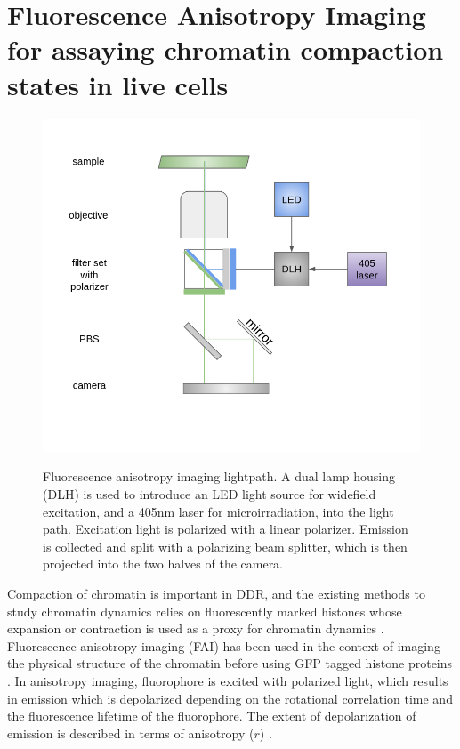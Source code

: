 \chapter{Fluorescence Anisotropy Imaging for assaying chromatin compaction states in live cells}
\begin{figure}[!htp]
    {\hfill\includegraphics[trim=0 50 0 60,clip,width=0.8\linewidth]{figures/setup.png}\hspace*{\fill}}
    \caption{Fluorescence anisotropy imaging lightpath. A dual lamp housing (DLH) is used to introduce an LED light source for widefield excitation, and a 405nm laser for microirradiation, into the light path. Excitation light is polarized with a linear polarizer. Emission is collected and split with a polarizing beam splitter, which is then projected into the two halves of the camera.}
    {\label{fig:setup}}
\end{figure}
Compaction of chromatin is important in DDR, and the existing methods to study chromatin dynamics relies on fluorescently marked histones whose expansion or contraction is used as a proxy for chromatin dynamics \cite{BURGESS20141703}. Fluorescence anisotropy imaging (FAI) has been used in the context of imaging the physical structure of the chromatin before using GFP tagged histone proteins \cite{banerjee2006chromatin}. In anisotropy imaging, fluorophore is excited with polarized light, which results in emission which is depolarized depending on the rotational correlation time and the fluorescence lifetime of the fluorophore. The extent of depolarization of emission is described in terms of anisotropy (\(r\)) \cite{lakowicz2013principles}.

